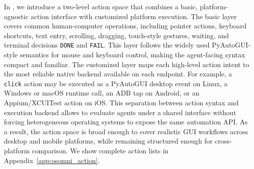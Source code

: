 In \dataset, we introduce a two-level action space that combines a basic, platform-agnostic action interface with customized platform execution. The basic layer covers common human-computer operations, including pointer actions, keyboard shortcuts, text entry, scrolling, dragging, touch-style gestures, waiting, and terminal decisions \texttt{DONE} and \texttt{FAIL}. This layer follows the widely used PyAutoGUI-style semantics for mouse and keyboard control, making the agent-facing syntax compact and familiar. The customized layer maps each high-level action intent to the most reliable native backend available on each endpoint. For example, a \texttt{click} action may be executed as a PyAutoGUI desktop event on Linux, a Windows or macOS runtime call, an ADB tap on Android, or an Appium/XCUITest action on iOS. This separation between action syntax and execution backend allows \dataset to evaluate agents under a shared interface without forcing heterogeneous operating systems to expose the same automation API. As a result, the action space is broad enough to cover realistic GUI workflows across desktop and mobile platforms, while remaining structured enough for cross-platform comparison. We show complete action lists in Appendix~\ref{app:osomni_action}.




